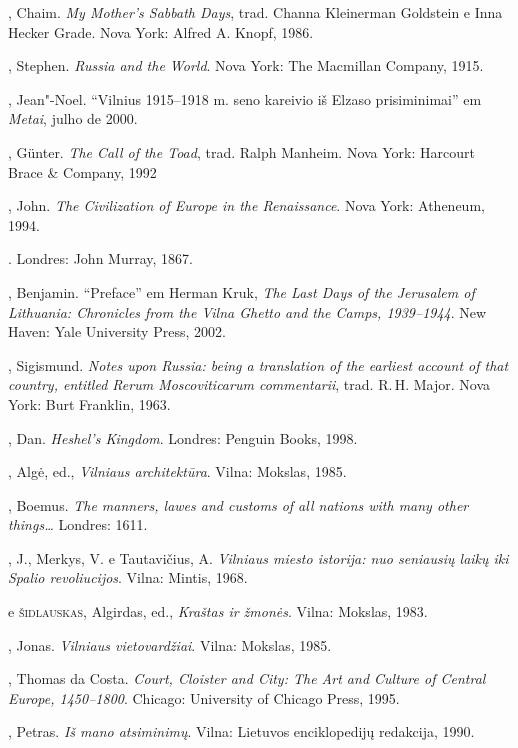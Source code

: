 \begin{bibliohedra}
  , Chaim. \textit{My Mother's Sabbath Days}, trad. Channa Kleinerman
  Goldstein e Inna Hecker Grade. Nova York: Alfred A. Knopf, 1986.

  , Stephen. \textit{Russia and the World}. Nova York: The Macmillan
  Company, 1915.

  , Jean"-Noel. ``Vilnius 1915--1918 m. seno kareivio iš Elzaso
  prisiminimai'' em \textit{Metai}, julho de 2000.

  , Günter. \textit{The Call of the Toad}, trad. Ralph Manheim. Nova
  York: Harcourt Brace \& Company, 1992

  , John. \textit{The Civilization of Europe in the Renaissance}. Nova
  York: Atheneum, 1994.

  . Londres:
  John Murray, 1867.

  , Benjamin. ``Preface'' em Herman Kruk, \textit{The Last Days of
  the Jerusalem of Lithuania: Chronicles from the Vilna Ghetto and the
  Camps, 1939--1944}. New
  Haven: Yale University Press, 2002.

  , Sigismund. \textit{Notes upon Russia: being a translation
  of the earliest account of that country, entitled Rerum Moscoviticarum
  commentarii}, trad. R.\,H. Major. Nova York: Burt
  Franklin, 1963.

  , Dan. \textit{Heshel's Kingdom}. Londres: Penguin Books, 1998.

  , Algė, ed., \textit{Vilniaus architektūra}. Vilna:
  Mokslas, 1985.

  , Boemus. \textit{The manners, lawes and customs of all nations
  with many other things\ldots{}} Londres: 1611.

  , J., Merkys, V. e Tautavičius, A. \textit{Vilniaus miesto
  istorija: nuo seniausių laikų iki Spalio revoliucijos}. Vilna:
  Mintis, 1968.

  \titidem e \textsc{šidlauskas}, Algirdas, ed., \textit{Kraštas ir
  žmonės}. Vilna: Mokslas, 1983.

  , Jonas. \textit{Vilniaus vietovardžiai}. Vilna: Mokslas,
  1985.

  , Thomas da Costa. \textit{Court, Cloister and City: The Art and
  Culture of Central Europe, 1450--1800}. Chicago: University of Chicago
  Press, 1995.

  , Petras. \textit{Iš mano atsiminimų}. Vilna: Lietuvos
  enciklopedijų redakcija, 1990.


\end{bibliohedra}
